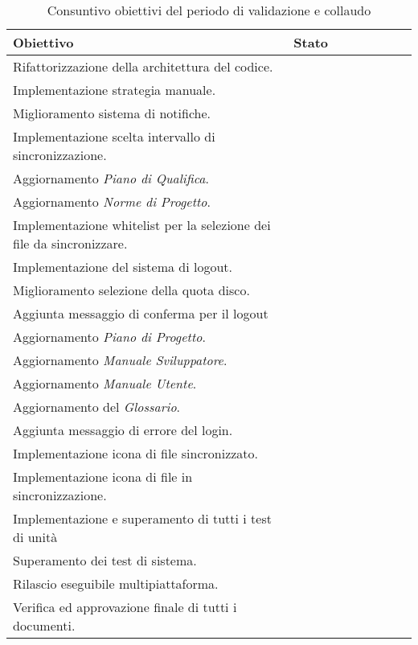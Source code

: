 \begin{table}[H]
		\begin{center}
			\setlength{\aboverulesep}{0pt}
			\setlength{\belowrulesep}{0pt}
			\setlength{\extrarowheight}{.75ex}
			\begin{tabular}{ l c c c c c c c }
				\rowcolor{AzzurroGruppo!30} 
				\textbf{Obiettivo} & \textbf{Stato} \\
				\toprule
				
				Rifattorizzazione della architettura del codice. & \checkmark{} \\
				Implementazione strategia manuale. & \checkmark{} \\
				Miglioramento sistema di notifiche. & \checkmark{} \\
				Implementazione scelta intervallo di sincronizzazione. & \checkmark{} \\
				Aggiornamento \textit{Piano di Qualifica}. & \checkmark{} \\	
				Aggiornamento \textit{Norme di Progetto}. & \checkmark{} \\		
				
				Implementazione whitelist per la selezione dei file da sincronizzare. & \checkmark{} \\
				Implementazione del sistema di logout. & \checkmark{} \\
				Miglioramento selezione della quota disco. & \checkmark{} \\
				Aggiunta messaggio di conferma per il logout & \checkmark{} \\
				Aggiornamento \textit{Piano di Progetto}. & \checkmark{} \\
				Aggiornamento \textit{Manuale Sviluppatore}. & \checkmark{} \\
				Aggiornamento \textit{Manuale Utente}. & \checkmark{} \\
				Aggiornamento del \textit{Glossario}. & \checkmark{} \\				
				
				Aggiunta messaggio di errore del login. & \checkmark{} \\
				Implementazione icona di file sincronizzato. & \checkmark{} \\
				Implementazione icona di file in sincronizzazione. & \checkmark{} \\
				Implementazione e superamento di tutti i test di unità & \checkmark{} \\
				Superamento dei test di sistema. & \checkmark{} \\ 
				Rilascio eseguibile multipiattaforma. & \checkmark{} \\
				Verifica ed approvazione finale di tutti i documenti. & \checkmark{} \\
				\bottomrule
			\end{tabular}
			\caption{Consuntivo obiettivi del periodo di validazione e collaudo}
		\end{center}
	\end{table}


